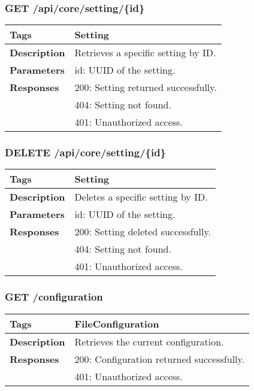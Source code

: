 \subsubsection*{GET /api/core/setting/\{id\}}
\begin{longtable}{|>{\raggedright\arraybackslash}p{3cm}|p{10cm}|}
\hline
\textbf{Tags} & Setting \\
\hline
\textbf{Description} & Retrieves a specific setting by ID. \\
\hline
\textbf{Parameters} & id: UUID of the setting. \\
\hline
\textbf{Responses} & 200: Setting returned successfully. \\
 & 404: Setting not found. \\
 & 401: Unauthorized access. \\
\hline
\end{longtable}

\subsubsection*{DELETE /api/core/setting/\{id\}}
\begin{longtable}{|>{\raggedright\arraybackslash}p{3cm}|p{10cm}|}
\hline
\textbf{Tags} & Setting \\
\hline
\textbf{Description} & Deletes a specific setting by ID. \\
\hline
\textbf{Parameters} & id: UUID of the setting. \\
\hline
\textbf{Responses} & 200: Setting deleted successfully. \\
 & 404: Setting not found. \\
 & 401: Unauthorized access. \\
\hline
\end{longtable}

\subsubsection*{GET /configuration}
\begin{longtable}{|>{\raggedright\arraybackslash}p{3cm}|p{10cm}|}
\hline
\textbf{Tags} & FileConfiguration \\
\hline
\textbf{Description} & Retrieves the current configuration. \\
\hline
\textbf{Responses} & 200: Configuration returned successfully. \\
 & 401: Unauthorized access. \\
\hline
\end{longtable}

